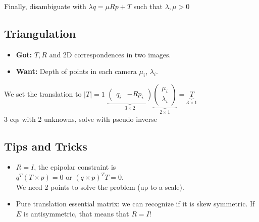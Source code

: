 Finally, disambiguate with $\lambda q = \mu R p + T$ such that $\lambda,
\mu > 0$

\subsection*{Triangulation}
\begin{itemize}
  \item \textbf{Got:} $T, R$ and 2D correspondences in two images.
  \item \textbf{Want:} Depth of points in each camera $\mu_i$, $\lambda_i$.
\end{itemize}

We set the translation to $|T| = 1$
$\underbrace{\begin{pmatrix}q_i & -R p_i\end{pmatrix}}_{3\times2}
\underbrace{\begin{pmatrix} \mu_i \\\lambda_i \end{pmatrix}}_{2\times1} =
\underbrace{T}_{3 \times 1}$\\
3 eqs with 2 unknowns, solve with pseudo inverse

\subsection*{Tips and Tricks}
\begin{itemize}
  \item $R = I$, the epipolar constraint is\\
    $q^T ( T \times p) = 0$ or $(q \times p)^T T = 0$.\\
    We need 2 points to solve the problem (up to a scale).
  \item Pure translation essential matrix: we can recognize if it is
    skew symmetric. If $E$ is antisymmetric, that means that $R = I$!
\end{itemize}

